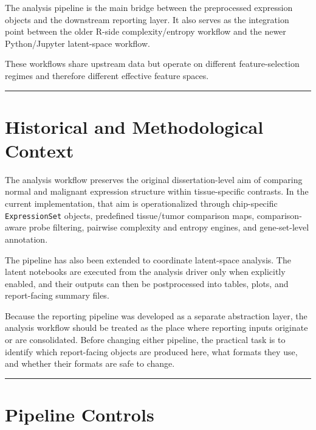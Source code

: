 \documentclass[
  letterpaper,
  DIV=11,
  numbers=noendperiod,
  openany,
  oneside]{scrreprt}
\begin{document}
The analysis pipeline is the main bridge between the preprocessed
expression objects and the downstream reporting layer. It also serves as
the integration point between the older R-side complexity/entropy
workflow and the newer Python/Jupyter latent-space workflow.

These workflows share upstream data but operate on different
feature-selection regimes and therefore different effective feature
spaces.

\begin{center}\rule{0.5\linewidth}{0.5pt}\end{center}

\section*{Historical and Methodological
Context}\label{historical-and-methodological-context-1}


The analysis workflow preserves the original dissertation-level aim of
comparing normal and malignant expression structure within
tissue-specific contrasts. In the current implementation, that aim is
operationalized through chip-specific \texttt{ExpressionSet} objects,
predefined tissue/tumor comparison maps, comparison-aware probe
filtering, pairwise complexity and entropy engines, and gene-set-level
annotation.

The pipeline has also been extended to coordinate latent-space analysis.
The latent notebooks are executed from the analysis driver only when
explicitly enabled, and their outputs can then be postprocessed into
tables, plots, and report-facing summary files.

Because the reporting pipeline was developed as a separate abstraction
layer, the analysis workflow should be treated as the place where
reporting inputs originate or are consolidated. Before changing either
pipeline, the practical task is to identify which report-facing objects
are produced here, what formats they use, and whether their formats are
safe to change.

\begin{center}\rule{0.5\linewidth}{0.5pt}\end{center}

\section*{Pipeline Controls}\label{pipeline-controls-1}
\end{document}
